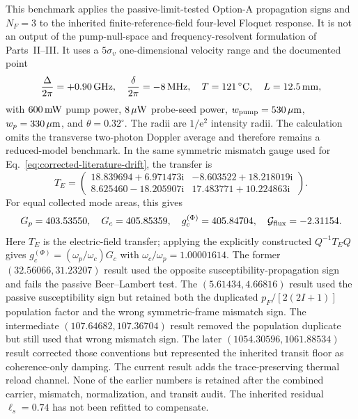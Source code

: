 \documentclass[11pt,a4paper]{article}
\newcommand{\ii}{\mathrm i}
\newcommand{\e}{\mathrm e}
\newcommand{\GHz}{\,\mathrm{GHz}}
\newcommand{\MHz}{\,\mathrm{MHz}}
\newcommand{\degC}{\,^{\circ}\mathrm C}
\begin{document}
This benchmark applies the passive-limit-tested Option-A propagation signs and
$N_F=3$ to the inherited finite-reference-field four-level Floquet response.
It is not an output of the pump-null-space and frequency-resolvent formulation
of Parts~II--III. It uses
a $5\sigma_v$ one-dimensional velocity range and the documented point
\[
\frac{\Delta}{2\pi}=+0.90\GHz,\quad
\frac{\delta}{2\pi}=-8\MHz,\quad T=121\degC,\quad L=12.5\,{\rm mm},
\]
with $600\,{\rm mW}$ pump power, $8\,\mu{\rm W}$ probe-seed power,
$w_{\rm pump}=530\,\mu{\rm m}$, $w_p=330\,\mu{\rm m}$, and
$\theta=0.32^\circ$. The radii are $1/\e^2$ intensity radii.
The calculation omits the transverse two-photon Doppler average and
therefore remains a reduced-model benchmark. In the same symmetric mismatch
gauge used for Eq.~\eqref{eq:corrected-literature-drift}, the transfer is
\[
T_E=
\begin{pmatrix}
18.839694+6.971473\ii&-8.603522+18.218019\ii\\
8.625460-18.205907\ii&17.483771+10.224863\ii
\end{pmatrix}.
\]
For equal collected mode areas, this gives
\[
G_p=403.53550,\quad G_c=405.85359,\quad
g_c^{(\Phi)}=405.84704,\quad \mathcal G_{\rm flux}=-2.31154.
\]
Here $T_E$ is the electric-field transfer; applying the explicitly constructed
$Q^{-1}T_EQ$ gives $g_c^{(\Phi)}=(\omega_p/\omega_c)G_c$ with
$\omega_c/\omega_p=1.00001614$. The former $(32.56066,31.23207)$ result used
the opposite susceptibility-propagation sign and fails the passive
Beer--Lambert test. The $(5.61434,4.66816)$ result used the passive
susceptibility sign but retained both the duplicated
$p_F/[2(2I+1)]$ population factor and the wrong symmetric-frame mismatch
sign. The intermediate $(107.64682,107.36704)$ result removed the population
duplicate but still used that wrong mismatch sign. The later
$(1054.30596,1061.88534)$ result corrected those conventions but represented
the inherited transit floor as coherence-only damping. The current result adds
the trace-preserving thermal reload channel. None of the earlier numbers is
retained after the combined carrier, mismatch, normalization, and transit audit.
The inherited residual $\ell_s=0.74$ has not been refitted to compensate.
\end{document}

